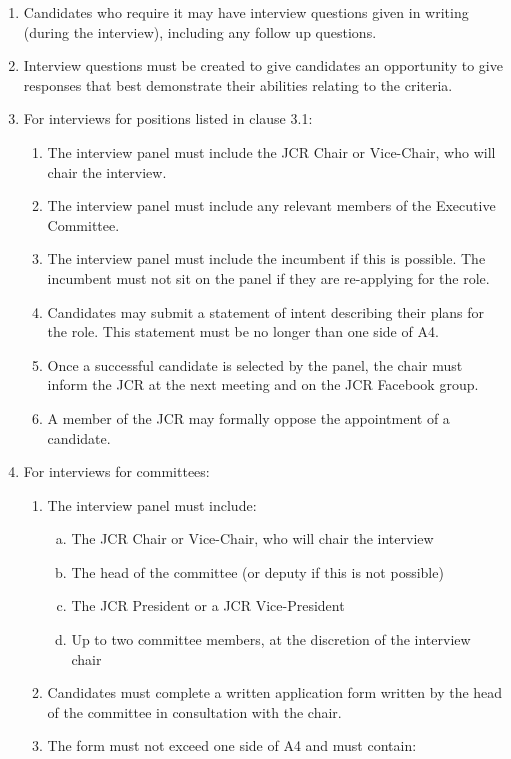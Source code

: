 \documentclass[12pt]{article}  %
\begin{document}
\begin{enumerate}
	\item Candidates who require it may have interview questions given in writing (during the interview), including any follow up questions.
	\item Interview questions must be created to give candidates an opportunity to give responses that best demonstrate their abilities relating to the criteria.
	\item For interviews for positions listed in clause 3.1:
	\begin{enumerate}
		\item The interview panel must include the JCR Chair or Vice-Chair, who will chair the interview.
		\item The interview panel must include any relevant members of the Executive Committee.
		\item The interview panel must include the incumbent if this is possible. The incumbent must not sit on the panel if they are re-applying for the role.
		\item Candidates may submit a statement of intent describing their plans for the role. This statement must be no longer than one side of A4.
		\item Once a successful candidate is selected by the panel, the chair must inform the JCR at the next meeting and on the JCR Facebook group.
		\item A member of the JCR may formally oppose the appointment of a candidate.
	\end{enumerate}
	\item For interviews for committees:
	\begin{enumerate}
		\item The interview panel must include:
		\begin{enumerate}[(a)]
			\item The JCR Chair or Vice-Chair, who will chair the interview
			\item The head of the committee (or deputy if this is not possible)
			\item The JCR President or a JCR Vice-President
			\item  Up to two committee members, at the discretion of the interview chair
		\end{enumerate}
		\item Candidates must complete a written application form written by the head of the committee in consultation with the chair.
		\item The form must not exceed one side of A4 and must contain:
		\begin{enumerate}[(a)]

\end{enumerate}
\end{enumerate}
\end{enumerate}
\end{document}

